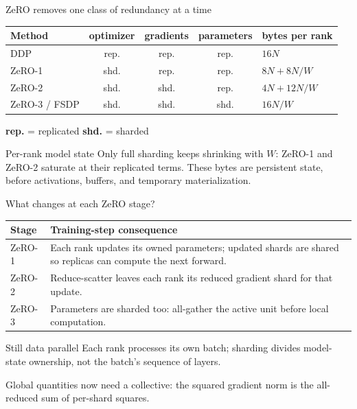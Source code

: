 \documentclass[handout]{beamer}
\begin{document}
\begin{frame}{ZeRO removes one class of redundancy at a time}
  \centering\small
  \begin{tabular}{@{}lcccl@{}}
    \toprule
    Method & optimizer & gradients & parameters & bytes per rank \\
    \midrule
    DDP & rep. & rep. & rep. & $16N$ \\
    ZeRO-1 & shd. & rep. & rep. & $8N+8N/W$ \\
    ZeRO-2 & shd. & shd. & rep. & $4N+12N/W$ \\
    ZeRO-3 / FSDP & shd. & shd. & shd. & $16N/W$ \\
    \bottomrule
  \end{tabular}
  \par\smallskip
  {\footnotesize \textbf{rep.} = replicated \qquad \textbf{shd.} = sharded}
  \vfill
  \begin{block}{Per-rank model state}
    Only full sharding keeps shrinking with $W$: ZeRO-1 and ZeRO-2 saturate at their replicated terms. These bytes are persistent state, before activations, buffers, and temporary materialization.
  \end{block}
\end{frame}

\begin{frame}{What changes at each ZeRO stage?}
  \small
  \begin{tabular}{@{}p{.15\linewidth}p{.78\linewidth}@{}}
    \toprule
    Stage & Training-step consequence \\
    \midrule
    ZeRO-1 & Each rank updates its owned parameters; updated shards are shared so replicas can compute the next forward. \\
    ZeRO-2 & Reduce-scatter leaves each rank its reduced gradient shard for that update. \\
    ZeRO-3 & Parameters are sharded too: all-gather the active unit before local computation. \\
    \bottomrule
  \end{tabular}
  \vfill
  \begin{block}{Still data parallel}
    Each rank processes its own batch; sharding divides model-state ownership, not the batch's sequence of layers.
  \end{block}
  \par\smallskip
  {\footnotesize Global quantities now need a collective: the squared gradient norm is the all-reduced sum of per-shard squares.}
\end{frame}
\end{document}
